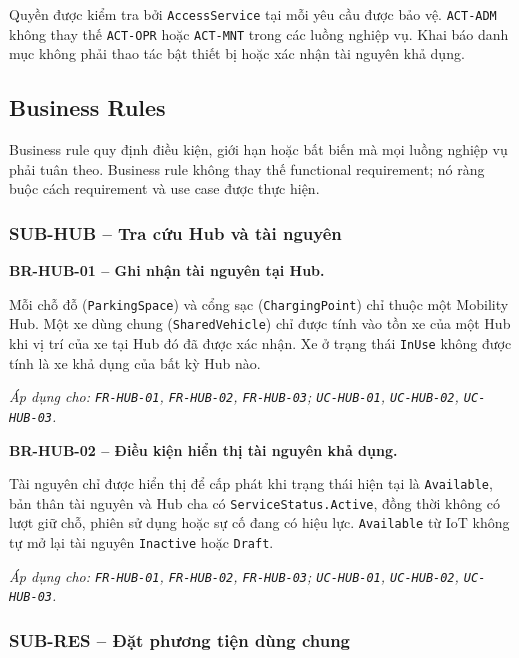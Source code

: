 Quyền được kiểm tra bởi \texttt{AccessService} tại mỗi yêu cầu được bảo vệ. \texttt{ACT-ADM} không thay thế \texttt{ACT-OPR} hoặc \texttt{ACT-MNT} trong các luồng nghiệp vụ. Khai báo danh mục không phải thao tác bật thiết bị hoặc xác nhận tài nguyên khả dụng.

\subsection{Business Rules}

Business rule quy định điều kiện, giới hạn hoặc bất biến mà mọi luồng nghiệp vụ phải tuân theo. Business rule không thay thế functional requirement; nó ràng buộc cách requirement và use case được thực hiện.

\subsubsection{SUB-HUB -- Tra cứu Hub và tài nguyên}

\noindent\textbf{BR-HUB-01 -- Ghi nhận tài nguyên tại Hub.}\par
\nopagebreak[4]
Mỗi chỗ đỗ (\texttt{ParkingSpace}) và cổng sạc (\texttt{ChargingPoint}) chỉ thuộc một Mobility Hub. Một xe dùng chung (\texttt{SharedVehicle}) chỉ được tính vào tồn xe của một Hub khi vị trí của xe tại Hub đó đã được xác nhận. Xe ở trạng thái \texttt{InUse} không được tính là xe khả dụng của bất kỳ Hub nào.

\textit{Áp dụng cho: \texttt{FR-HUB-01}, \texttt{FR-HUB-02}, \texttt{FR-HUB-03};\newline
\texttt{UC-HUB-01}, \texttt{UC-HUB-02}, \texttt{UC-HUB-03}.}

\medskip
\noindent\textbf{BR-HUB-02 -- Điều kiện hiển thị tài nguyên khả dụng.}\par
\nopagebreak[4]
Tài nguyên chỉ được hiển thị để cấp phát khi trạng thái hiện tại là \texttt{Available}, bản thân tài nguyên và Hub cha có \texttt{ServiceStatus.Active}, đồng thời không có lượt giữ chỗ, phiên sử dụng hoặc sự cố đang có hiệu lực. \texttt{Available} từ IoT không tự mở lại tài nguyên \texttt{Inactive} hoặc \texttt{Draft}.

\textit{Áp dụng cho: \texttt{FR-HUB-01}, \texttt{FR-HUB-02}, \texttt{FR-HUB-03};\newline
\texttt{UC-HUB-01}, \texttt{UC-HUB-02}, \texttt{UC-HUB-03}.}

\subsubsection{SUB-RES -- Đặt phương tiện dùng chung}

